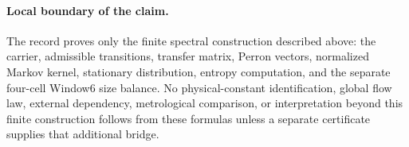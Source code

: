 \paragraph{Local boundary of the claim.}
The record proves only the finite spectral construction described above: the carrier, admissible transitions, transfer matrix, Perron vectors, normalized Markov kernel, stationary distribution, entropy computation, and the separate four-cell Window6 size balance.  No physical-constant identification, global flow law, external dependency, metrological comparison, or interpretation beyond this finite construction follows from these formulas unless a separate certificate supplies that additional bridge.
